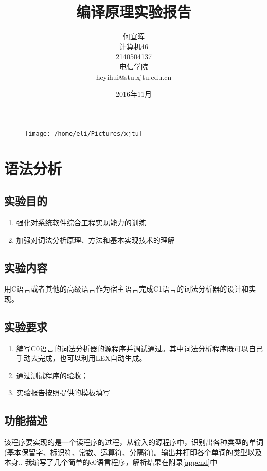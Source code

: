 \documentclass{article}
\date{2016年11月}
\title{编译原理实验报告}
\author{何宜晖\\计算机46\\2140504137\\电信学院\\heyihui@stu.xjtu.edu.cn}
\begin{document}
\begin{CJK}{UTF8}{gkai}
\begin{figure}
\centering
\texttt{[image: /home/eli/Pictures/xjtu]}
\end{figure}


\maketitle
\clearpage

\tableofcontents
\clearpage

\section{语法分析}
\subsection{实验目的}
\begin{enumerate}
	\item 强化对系统软件综合工程实现能力的训练
	\item 加强对词法分析原理、方法和基本实现技术的理解
\end{enumerate}

\subsection{实验内容}
用C语言或者其他的高级语言作为宿主语言完成C1语言的词法分析器的设计和实现。
\subsection{实验要求}
\begin{enumerate}
\item 编写C0语言的词法分析器的源程序并调试通过。其中词法分析程序既可以自己手动去完成，也可以利用LEX自动生成。
\item 通过测试程序的验收； 
\item 实验报告按照提供的模板填写 
\end{enumerate}


\subsection{功能描述}
该程序要实现的是一个读程序的过程，从输入的源程序中，识别出各种类型的单词(基本保留字、标识符、常数、运算符、分隔符)。输出并打印各个单词的类型以及本身.\cite{chen2000}\cite{appel2004modern}\cite{louden2000}\cite{appel2006}.
我编写了几个简单的c0语言程序，解析结果在附录\ref{append}中


\end{CJK}
\end{document}

